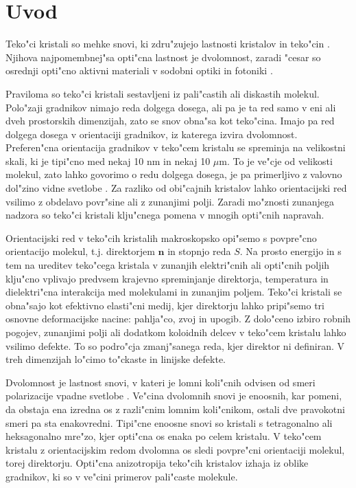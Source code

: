 \documentclass[12pt,twoside,openright,final,a4paper]{report}
\begin{document}
\tableofcontents

\chapter{Uvod} %

Teko"ci kristali so mehke snovi, ki zdru"zujejo lastnosti kristalov in teko"cin \cite{degennes}. 
Njihova najpomembnej"sa opti"cna lastnost je dvolomnost, zaradi "cesar so osrednji opti"cno aktivni materiali v sodobni optiki in fotoniki \cite{optics-lcd}.

Praviloma so teko"ci kristali sestavljeni iz pali"castih ali diskastih molekul. 
Polo"zaji gradnikov nimajo reda dolgega dosega, ali pa je ta red samo v eni ali dveh prostorskih dimenzijah, zato se snov obna"sa kot teko"cina. 
Imajo pa red dolgega dosega v orientaciji gradnikov, iz katerega izvira dvolomnost. 
Preferen"cna orientacija gradnikov v teko"cem kristalu se spreminja na velikostni skali, ki je tipi"cno med nekaj 10 nm in nekaj 10 $\mu$m.
To je ve"cje od velikosti molekul, zato lahko govorimo o redu dolgega dosega, je pa primerljivo z valovno dol"zino vidne svetlobe \cite{kleman}. 
Za razliko od obi"cajnih kristalov lahko orientacijski red vsilimo z obdelavo povr"sine ali z zunanjimi polji. 
Zaradi mo"znosti zunanjega nadzora so teko"ci kristali klju"cnega pomena v mnogih opti"cnih napravah. 

Orientacijski red v teko"cih kristalih makroskopsko opi"semo s povpre"cno orientacijo molekul, t.j. direktorjem $\mathbf{n}$ in stopnjo reda $S$. 
Na prosto energijo in s tem na ureditev teko"cega kristala v zunanjih elektri"cnih ali opti"cnih poljih klju"cno vplivajo predvsem krajevno spreminjanje direktorja, temperatura in dielektri"cna interakcija med molekulami in zunanjim poljem. 
Teko"ci kristali se obna"sajo kot efektivno elasti"cni medij, kjer direktorju lahko pripi"semo tri osnovne deformacijske nacine: pahlja"co, zvoj in upogib.
Z dolo"ceno izbiro robnih pogojev, zunanjimi polji ali dodatkom koloidnih delcev v teko"cem kristalu lahko vsilimo defekte. 
To so podro"cja zmanj"sanega reda, kjer direktor ni definiran. 
V treh dimenzijah lo"cimo to"ckaste in linijske defekte. 

Dvolomnost je lastnost snovi, v kateri je lomni koli"cnih odvisen od smeri polarizacije vpadne svetlobe \cite{landau-lifsic-optics}. 
Ve"cina dvolomnih snovi je enoosnih, kar pomeni, da obstaja ena izredna os z razli"cnim lomnim koli"cnikom, ostali dve pravokotni smeri pa sta enakovredni. 
Tipi"cne enoosne snovi so kristali s tetragonalno ali heksagonalno mre"zo, kjer opti"cna os enaka po celem kristalu. 
V teko"cem kristalu z orientacijskim redom dvolomna os sledi povpre"cni orientaciji molekul, torej direktorju.
Opti"cna anizotropija teko"cih kristalov izhaja iz oblike gradnikov, ki so v ve"cini primerov pali"caste molekule. 
\end{document}
